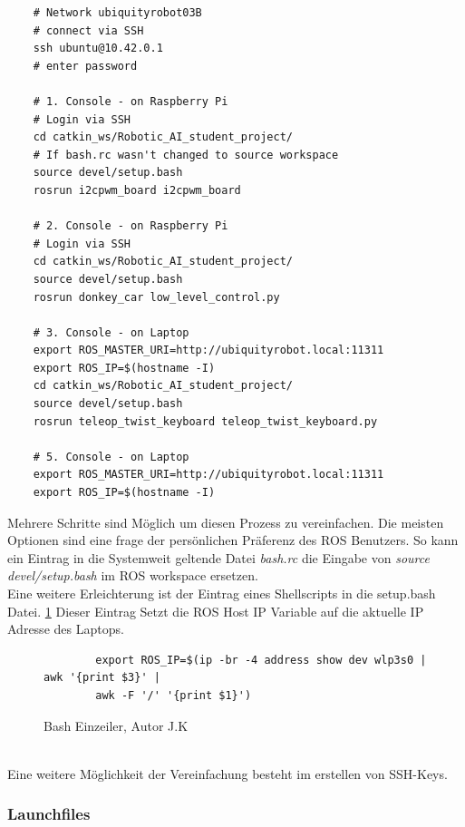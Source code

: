 \documentclass[conference]{IEEEtran}
\begin{document}
	\begin{verbatim}
	# Network ubiquityrobot03B
	# connect via SSH
	ssh ubuntu@10.42.0.1
	# enter password
	
	# 1. Console - on Raspberry Pi
	# Login via SSH
	cd catkin_ws/Robotic_AI_student_project/
	# If bash.rc wasn't changed to source workspace
	source devel/setup.bash
	rosrun i2cpwm_board i2cpwm_board
	
	# 2. Console - on Raspberry Pi
	# Login via SSH
	cd catkin_ws/Robotic_AI_student_project/
	source devel/setup.bash
	rosrun donkey_car low_level_control.py
	
	# 3. Console - on Laptop 
	export ROS_MASTER_URI=http://ubiquityrobot.local:11311
	export ROS_IP=$(hostname -I)
	cd catkin_ws/Robotic_AI_student_project/
	source devel/setup.bash
	rosrun teleop_twist_keyboard teleop_twist_keyboard.py
	
	# 5. Console - on Laptop
	export ROS_MASTER_URI=http://ubiquityrobot.local:11311
	export ROS_IP=$(hostname -I)

	\end{verbatim}
	
	Mehrere Schritte sind Möglich um diesen Prozess zu vereinfachen. Die 
	meisten Optionen sind eine frage der persönlichen Präferenz des ROS 
	Benutzers.  So kann ein Eintrag in die Systemweit geltende Datei 
	\textit{bash.rc} die Eingabe von \textit{source devel/setup.bash} im ROS 
	workspace ersetzen. \\
	Eine weitere Erleichterung ist der Eintrag eines Shellscripts in die 
	setup.bash Datei. \ref{Einzeiler} Dieser Eintrag Setzt die ROS Host IP 
	Variable auf die aktuelle IP Adresse des Laptops.
	\begin{figure}
		\centering
		\begin{verbatim}
		export ROS_IP=$(ip -br -4 address show dev wlp3s0 | awk '{print $3}' | 
		awk -F '/' '{print $1}')
		\end{verbatim}
		\label{Einzeiler}
		\caption{Bash Einzeiler, Autor J.K }
	\end{figure}
	\\
	Eine weitere Möglichkeit der Vereinfachung besteht im erstellen von 
	SSH-Keys. 
	
	\subsubsection{Launchfiles}
	
\end{document}
